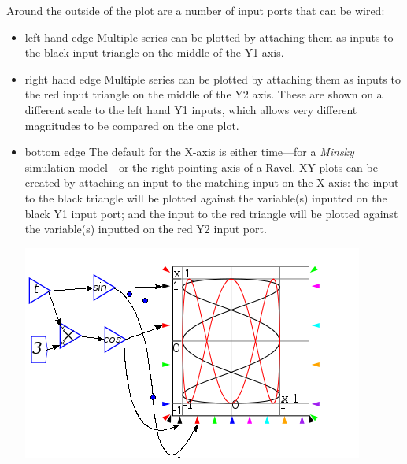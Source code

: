 Around the outside of the plot are a number of input ports that can
be wired:
\begin{itemize}
\item left hand edge Multiple series can be plotted by attaching them as
inputs to the black input triangle on the middle of the Y1 axis.
\item right hand edge Multiple series can be plotted by attaching them
as inputs to the red input triangle on the middle of the Y2 axis.
These are shown on a different scale to the left hand Y1 inputs, which
allows very different magnitudes to be compared on the one plot. 
\item bottom edge The default for the X-axis is either time---for a \emph{Minsky}
simulation model---or the right-pointing axis of a Ravel. XY plots
can be created by attaching an input to the matching input on the
X axis: the input to the black triangle will be plotted against the
variable(s) inputted on the black Y1 input port; and the input to
the red triangle will be plotted against the variable(s) inputted
on the red Y2 input port.
\begin{center}
\includegraphics{images/plotLissajous} 
\par\end{center}


\end{itemize}

